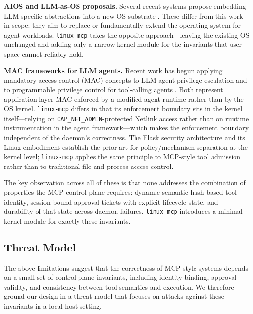 \textbf{AIOS and LLM-as-OS proposals.}
Several recent systems propose embedding LLM-specific abstractions into a new OS substrate \cite{zhang2024llmos, wu2024oscopilot, packer2024memgpt}.
These differ from this work in scope: they aim to replace or fundamentally extend the operating system for agent workloads.
\texttt{linux-mcp} takes the opposite approach---leaving the existing OS unchanged and adding only a narrow kernel module for the invariants that user space cannot reliably hold.

\textbf{MAC frameworks for LLM agents.}
Recent work has begun applying mandatory access control (MAC) concepts to LLM agent privilege escalation \cite{ji2026seagent} and to programmable privilege control for tool-calling agents \cite{shi2025progent}.
Both represent application-layer MAC enforced by a modified agent runtime rather than by the OS kernel.
\texttt{linux-mcp} differs in that its enforcement boundary sits in the kernel itself---relying on \texttt{CAP\_NET\_ADMIN}-protected Netlink access rather than on runtime instrumentation in the agent framework---which makes the enforcement boundary independent of the daemon's correctness. The Flask security architecture \cite{spencer1999flask} and its Linux embodiment \cite{loscocco2001selinux} establish the prior art for policy/mechanism separation at the kernel level; \texttt{linux-mcp} applies the same principle to MCP-style tool admission rather than to traditional file and process access control.

The key observation across all of these is that none addresses the combination of properties the MCP control plane requires: dynamic semantic-hash-based tool identity, session-bound approval tickets with explicit lifecycle state, and durability of that state across daemon failures.
\texttt{linux-mcp} introduces a minimal kernel module for exactly these invariants.



\subsection{Threat Model}

The above limitations suggest that the correctness of MCP-style systems depends on a small set of control-plane invariants, including identity binding, approval validity, and consistency between tool semantics and execution.
We therefore ground our design in a threat model that focuses on attacks against these invariants in a local-host setting.

